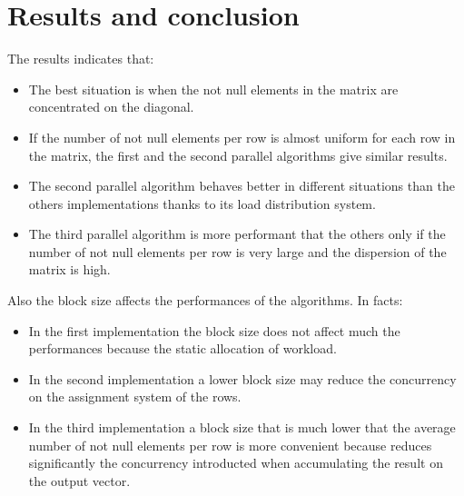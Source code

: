 \documentclass[conference]{IEEEtran}
\begin{document}
\section{Results and conclusion}
The results indicates that:
\begin{itemize}
    \item The best situation is when the not null elements in the matrix are concentrated on the diagonal.
    \item If the number of not null elements per row is almost uniform for each row in the matrix, the first and the second parallel algorithms give similar results. 
    \item The second parallel algorithm behaves better in different situations than the others implementations thanks to its load distribution system.
    \item The third parallel algorithm is more performant that the others only if the number of not null elements per row is very large and the dispersion of the matrix is high.
\end{itemize}
Also the block size affects the performances of the algorithms. In facts:
\begin{itemize}
    \item In the first implementation the block size does not affect much the performances because the static allocation of workload. 
    \item In the second implementation a lower block size may reduce the concurrency on the assignment system of the rows. 
    \item In the third implementation a block size that is much lower that the average number of not null elements per row is more convenient because reduces significantly the concurrency introducted when accumulating the result on the output vector. 
\end{itemize}


\end{document}
